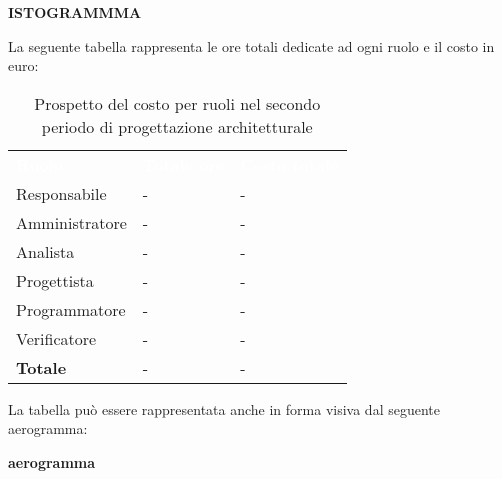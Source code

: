 \textbf{ISTOGRAMMMA}


La seguente tabella rappresenta le ore totali dedicate ad ogni ruolo e il costo in euro:

\begin{table}[!htbp]
\begin{center}
\renewcommand{\arraystretch}{1.5}
\begin{tabular}{ m{}<{\centering}  m{}<{\centering} m{}<{\centering}}
	\rowcolor{darkblue}
	\textcolor{white}{\textbf{Ruolo}}&\textcolor{white}{\textbf{Totale ore}}&\textcolor{white}{\textbf{Costo totale}}\\ 

	Responsabile  & - & - \\	

	Amministratore & - & - \\
	
	Analista & - & - \\
	
	Progettista & - & - \\
	
	Programmatore & - & - \\
	
	Verificatore & - & - \\
	
	\textbf{Totale} & - & - \\
	
\end{tabular}
\caption{Prospetto del costo per ruoli nel secondo periodo di progettazione architetturale}
\end{center}
\end{table}

La tabella può essere rappresentata anche in forma visiva dal seguente aerogramma:

\textbf{aerogramma}


